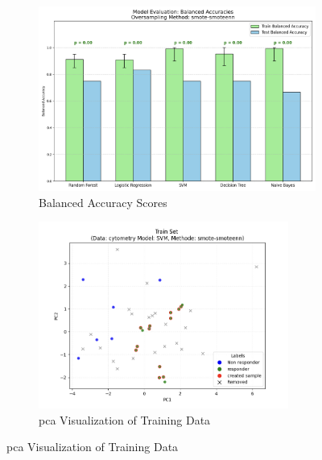 \documentclass[12pt,a4paper]{report}
\begin{document}
\begin{figure}[h!]
    \centering

    \begin{subfigure}[b]{0.48\textwidth}
        \centering
        \includegraphics[width=\textwidth]{images/smote_een_fig2a.png}
        \caption{Balanced Accuracy Scores}
        \label{fig:smote_enn_fig2a}
    \end{subfigure}
    \hfill
    \begin{subfigure}[b]{0.48\textwidth}
        \centering
        \includegraphics[width=0.9\textwidth]{images/smote_een_fig2b.png}
        \caption{\gls{pca} Visualization of Training Data}
        \label{fig:smote_enn_fig2b}
    \end{subfigure}

    \vspace{1em}


\end{figure}
\end{document}
